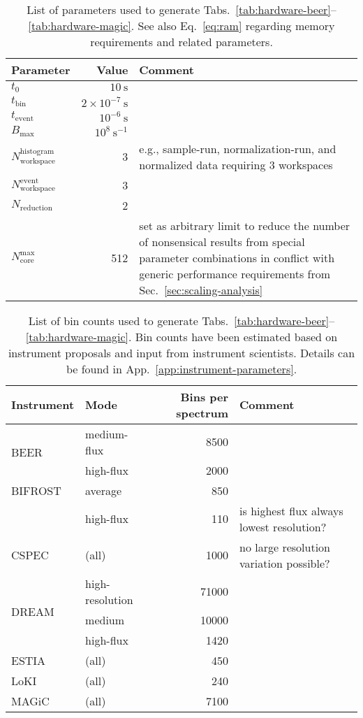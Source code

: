 \documentclass[a4paper,english,numbers=noenddot,bibliography=totoc,chapterprefix=on,DIV=12]{scrartcl}
\newcommand{\Tbin}{t_{\text{bin}}}
\newcommand{\Tevent}{t_{\text{event}}}
\newcommand{\Ncore}{N_{\text{core}}}
\newcommand{\Nreduction}{N_{\text{reduction}}}
\newcommand{\Nworkspace}{N_{\text{workspace}}}
\newcommand{\Bmax}{B_{\text{max}}}
\newcommand{\beer}{BEER\xspace}
\newcommand{\bifrost}{BIFROST\xspace}
\newcommand{\cspec}{CSPEC\xspace}
\newcommand{\dream}{DREAM\xspace}
\newcommand{\estia}{ESTIA\xspace}
\newcommand{\loki}{LoKI\xspace}
\newcommand{\magic}{MAGiC\xspace}
\begin{document}
\begin{table}
  \centering
  \begin{tabular}{lrp{8cm}}
    Parameter & Value & Comment\\
    \hline
    $t_0$ & $10~\mathrm{s}$ \\
    $\Tbin$ & $2\times10^{-7}~\mathrm{s}$ \\
    $\Tevent$ & $10^{-6}~\mathrm{s}$ \\
    $\Bmax$ & $10^8~\mathrm{s}^{-1}$ \\
    $\Nworkspace^{\text{histogram}}$ & 3 & e.g., sample-run, normalization-run, and normalized data requiring 3 workspaces \\
    $\Nworkspace^{\text{event}}$ & 3 \\
    $\Nreduction$ & 2 \\
    $\Ncore^{\text{max}}$ & 512 & set as arbitrary limit to reduce the number of nonsensical results from special parameter combinations in conflict with generic performance requirements from Sec.~\ref{sec:scaling-analysis} \\
    \hline
  \end{tabular}
  \caption{\label{tab:hardware-estimation-parameters}
  List of parameters used to generate Tabs.~\ref{tab:hardware-beer}--\ref{tab:hardware-magic}.
  See also Eq.~\eqref{eq:ram} regarding memory requirements and related parameters.
}
\end{table}

\begin{table}
  \centering
  \begin{tabular}{llrl}
    Instrument & Mode & Bins per spectrum & Comment \\
    \hline
    \hline
    \multirow{2}{*}{\beer}
    & medium-flux & 8500 \\
    & high-flux & 2000 \\
    \hline
    \multirow{1}{*}{\bifrost}
    & average & 850\\
    & high-flux & 110 & is highest flux always lowest resolution?\\
    \hline
    \multirow{1}{*}{\cspec}
    & (all) & 1000 & no large resolution variation possible? \\
    \hline
    \multirow{3}{*}{\dream}
    & high-resolution & 71000 \\
    & medium & 10000 \\
    & high-flux & 1420 \\
    \hline
    \multirow{1}{*}{\estia}
    & (all) & 450 \\
    \hline
    \multirow{1}{*}{\loki}
    & (all)    & 240 \\
    \hline
    \multirow{1}{*}{\magic}
    & (all) & 7100 \\
    \hline
  \end{tabular}
  \caption{\label{tab:resolution}
List of bin counts used to generate Tabs.~\ref{tab:hardware-beer}--\ref{tab:hardware-magic}.
Bin counts have been estimated based on instrument proposals and input from instrument scientists.
Details can be found in App.~\ref{app:instrument-parameters}.
}
\end{table}
\end{document}
